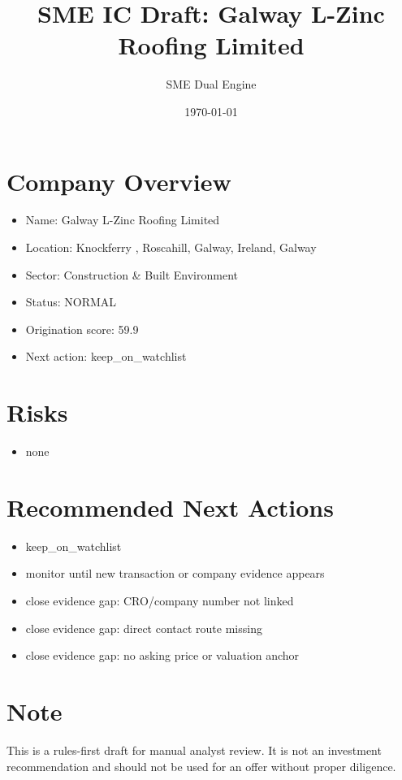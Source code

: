 \documentclass[11pt,a4paper]{article}
\title{SME IC Draft: Galway L-Zinc Roofing Limited}
\author{SME Dual Engine}
\date{\today}
\begin{document}
\maketitle
\section*{Company Overview}
\begin{itemize}[leftmargin=1.4em]
\item Name: Galway L-Zinc Roofing Limited
\item Location: Knockferry , Roscahill, Galway, Ireland, Galway
\item Sector: Construction \& Built Environment
\item Status: NORMAL
\item Origination score: 59.9
\item Next action: keep\_on\_watchlist
\end{itemize}
\section*{Risks}
\begin{itemize}[leftmargin=1.4em]
\item none
\end{itemize}
\section*{Recommended Next Actions}
\begin{itemize}[leftmargin=1.4em]
\item keep\_on\_watchlist
\item monitor until new transaction or company evidence appears
\item close evidence gap: CRO/company number not linked
\item close evidence gap: direct contact route missing
\item close evidence gap: no asking price or valuation anchor
\end{itemize}
\section*{Note}
This is a rules-first draft for manual analyst review. It is not an investment
recommendation and should not be used for an offer without proper diligence.
\end{document}
